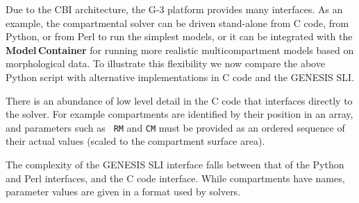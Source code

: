 \documentclass[12pt]{article}
\begin{document}
Due to the CBI architecture, the G-3 platform provides many interfaces.
As an example, the compartmental solver can be driven stand-alone from
C code, from Python, or from Perl to run the simplest models, or it
can be integrated with the {\bf Model\,Container} for running more realistic
multicompartment models based on morphological data.  To illustrate
this flexibility we now compare the above Python script with
alternative implementations in C code and the GENESIS SLI.

There is an abundance of low level detail in the C code that
interfaces directly to the solver.  For example compartments are
identified by their position in an array, and parameters such as {\tt
  RM} and {\tt CM} must be provided as an ordered sequence of their
actual values (scaled to the compartment surface area).

The complexity of the GENESIS SLI interface falls between that of the
Python and Perl interfaces, and the C code interface.  While compartments have
names, parameter values are given in a format used by solvers.
\end{document}
